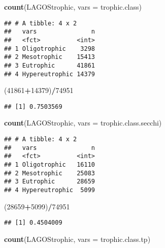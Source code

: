 \documentclass[]{article}
\newenvironment{Shaded}{\begin{snugshade}}{\end{snugshade}}
\newcommand{\DataTypeTok}[1]{\textcolor[rgb]{0.13,0.29,0.53}{#1}}
\newcommand{\DecValTok}[1]{\textcolor[rgb]{0.00,0.00,0.81}{#1}}
\newcommand{\KeywordTok}[1]{\textcolor[rgb]{0.13,0.29,0.53}{\textbf{#1}}}
\newcommand{\NormalTok}[1]{#1}
\newcommand{\OperatorTok}[1]{\textcolor[rgb]{0.81,0.36,0.00}{\textbf{#1}}}
\begin{document}
\begin{Shaded}
\begin{Highlighting}[]
\KeywordTok{count}\NormalTok{(LAGOStrophic, }\DataTypeTok{vars =}\NormalTok{ trophic.class)}
\end{Highlighting}
\end{Shaded}

\begin{verbatim}
## # A tibble: 4 x 2
##   vars               n
##   <fct>          <int>
## 1 Oligotrophic    3298
## 2 Mesotrophic    15413
## 3 Eutrophic      41861
## 4 Hypereutrophic 14379
\end{verbatim}

\begin{Shaded}
\begin{Highlighting}[]
\NormalTok{(}\DecValTok{41861}\OperatorTok{+}\DecValTok{14379}\NormalTok{)}\OperatorTok{/}\DecValTok{74951}
\end{Highlighting}
\end{Shaded}

\begin{verbatim}
## [1] 0.7503569
\end{verbatim}

\begin{Shaded}
\begin{Highlighting}[]
\KeywordTok{count}\NormalTok{(LAGOStrophic, }\DataTypeTok{vars =}\NormalTok{ trophic.class.secchi)}
\end{Highlighting}
\end{Shaded}

\begin{verbatim}
## # A tibble: 4 x 2
##   vars               n
##   <fct>          <int>
## 1 Oligotrophic   16110
## 2 Mesotrophic    25083
## 3 Eutrophic      28659
## 4 Hypereutrophic  5099
\end{verbatim}

\begin{Shaded}
\begin{Highlighting}[]
\NormalTok{(}\DecValTok{28659}\OperatorTok{+}\DecValTok{5099}\NormalTok{)}\OperatorTok{/}\DecValTok{74951}
\end{Highlighting}
\end{Shaded}

\begin{verbatim}
## [1] 0.4504009
\end{verbatim}

\begin{Shaded}
\begin{Highlighting}[]
\KeywordTok{count}\NormalTok{(LAGOStrophic, }\DataTypeTok{vars =}\NormalTok{ trophic.class.tp)}
\end{Highlighting}
\end{Shaded}
\end{document}
